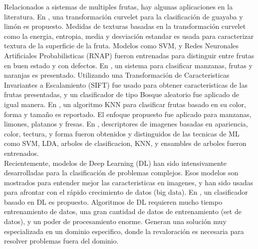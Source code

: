 \documentclass[twoside,spanish,ESP,MSc]{plantillaLabUPV}
\theoremstyle{definition}
\begin{document}
Relacionados a sistemas de multiples frutas, hay algunas aplicaciones en la literatura. En \cite{curvelet}, una transformación curvelet para la clasificación de guayaba y limón es propuesto. Medidas de texturas basadas en la transformación curvelet como la energia, entropia, media y desviación estandar es usada para caracterizar textura de la superficie de la fruta. Modelos como SVM, y Redes Neuronales Artificiales  Probabilisticas (RNAP) fueron entrenadas para distinguir entre frutas en buen estado y con defectos. 
En \cite{7086191}, un sistema para clasificar manzanas, frutas y naranjas es presentado. Utilizando una Transformación de Caracteristicas Invariantes a Escalamiento (SIFT) fue usado para obtener caracteristicas de las frutas presentadas, y un clasificador de tipo Bosque aleatorio fue aplicado de igual manera. 
En \cite{5254804}, un algoritmo KNN para clasificar frutas basado en su color, forma y tamaño es reportado. El enfoque propuesto fue aplicado para manzanas, limones, platanos y fresas. En \cite{ROCHA201096}, descriptores de imagenes basadas en apariencia, color, tectura, y forma fueron obtenidos y distinguidos de las tecnicas de ML como SVM, LDA, arboles de clasificacion, KNN, y ensambles de arboles fueron entrenados.\\




Recientemente, modelos de Deep Learning (DL) han sido intensivamente desarrolladas para la clasificación de problemas complejos. Esos modelos son mostrados para entender mejor las caracteristicas en imagenes, y han sido usadas para afrontar con el rápido crecimiento de datos (big data). En \cite{8488544}, un clasificador basado en DL es propuesto. Algoritmos de DL requieren mucho tiempo entrenamiento de datos, una gran cantidad de datos de entrenamiento (set de datos), y un poder de procesamiento enorme. Generan una solución muy especializada en un dominio especifico, donde la revaloración es necesaria para resolver problemas fuera del dominio.\\


\end{document}
